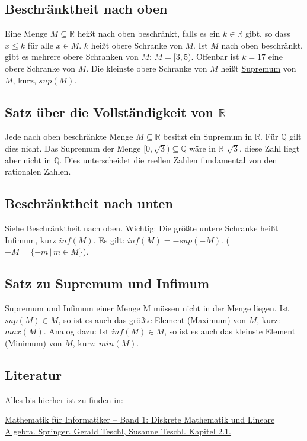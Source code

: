 \subsection{Beschränktheit nach oben}
Eine Menge $M \subseteq \mathbb{R}$ heißt nach oben beschränkt, falls es ein $k \in \mathbb{R}$ gibt, so dass $x \le k$ für alle $x \in M$. $k$ heißt obere Schranke von $M$. Ist $M$ nach oben beschränkt, gibt es mehrere obere Schranken von $M$: $M = [3,5)$. Offenbar ist $k = 17$ eine obere Schranke von $M$. Die kleinste obere Schranke von $M$ heißt \underline{Supremum} von $M$, kurz, $sup(M)$.

\subsection{Satz über die Vollständigkeit von $\mathbb{R}$}
Jede nach oben beschränkte Menge $M \subseteq \mathbb{R}$ besitzt ein Supremum in $\mathbb{R}$. Für $\mathbb{Q}$ gilt dies nicht. Das Supremum der Menge $[0,\sqrt{3}) \subseteq \mathbb{Q}$ wäre in $\mathbb{R}$ $\sqrt{3}$, diese Zahl liegt aber nicht in $\mathbb{Q}$. Dies unterscheidet die reellen Zahlen fundamental von den rationalen Zahlen.

\subsection{Beschränktheit nach unten}
Siehe Beschränktheit nach oben. Wichtig: Die größte untere Schranke heißt \underline{Infimum}, kurz $inf(M)$. Es gilt: $inf(M) = -sup(-M)$. ($-M = \{-m\,|\,m \in M\}$).

\subsection{Satz zu Supremum und Infimum} Supremum und Infimum einer Menge M müssen nicht in der Menge liegen. Ist $sup(M) \in M$, so ist es auch das größte Element (Maximum) von $M$, kurz: $max(M)$. Analog dazu: Ist $inf(M) \in M$, so ist es auch das kleinste Element (Minimum) von $M$, kurz: $min(M)$.

\subsection{Literatur}
Alles bis hierher ist zu finden in:

\href{http://www.mat.univie.ac.at/~gerald/ftp/book-mfi/mfi1.pdf}{Mathematik für Informatiker -- Band 1: Diskrete Mathematik und Lineare Algebra. Springer. Gerald Teschl, Susanne Teschl. Kapitel 2.1.}

